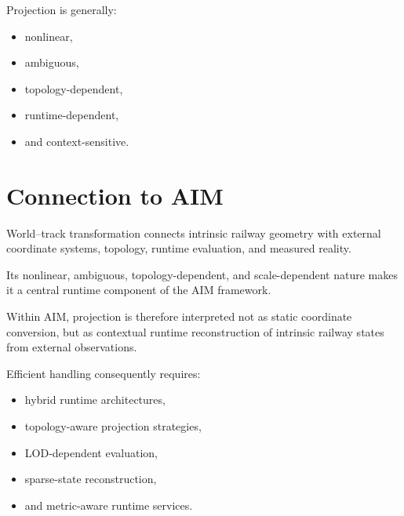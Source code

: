 \begin{proposition}
Projection is generally:
\begin{itemize}
\item nonlinear,
\item ambiguous,
\item topology-dependent,
\item runtime-dependent,
\item and context-sensitive.
\end{itemize}
\end{proposition}

\section{Connection to AIM}

\begin{summary}
World--track transformation connects intrinsic railway geometry with
external coordinate systems, topology, runtime evaluation, and measured
reality.

Its nonlinear, ambiguous, topology-dependent, and scale-dependent nature
makes it a central runtime component of the AIM framework.

Within AIM, projection is therefore interpreted not as static coordinate
conversion, but as contextual runtime reconstruction of intrinsic
railway states from external observations.

Efficient handling consequently requires:
\begin{itemize}
\item hybrid runtime architectures,
\item topology-aware projection strategies,
\item LOD-dependent evaluation,
\item sparse-state reconstruction,
\item and metric-aware runtime services.
\end{itemize}
\end{summary}

